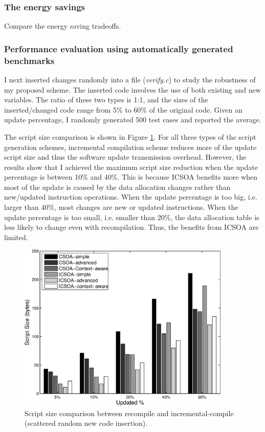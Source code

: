\subsubsection{The energy savings}
Compare the energy saving tradeoffs.

\subsubsection{Performance evaluation using automatically generated benchmarks}
I next inserted changes randomly into a file ({\em verify.c}) to study the robustness of my proposed scheme. The inserted code involves the use of both existing and new variables. The ratio of these two types is 1:1, and the sizes of the inserted/changed code range from 5\% to 60\% of the original code. Given an update percentage, I randomly generated 500 test cases and reported the average.

The script size comparison is shown in Figure \ref{upd_rand_bar}. For all three types of the script generation schemes, incremental compilation scheme reduces more of the
update script size and thus the software update transmission overhead. However, the results show that I achieved the maximum script size reduction when the update percentage is between 10\% and 40\%. This is because ICSOA benefits more when most of the update is caused by the data allocation changes rather than new/updated instruction operations. When the update percentage is too big, i.e. larger than 40\%, most changes are new or updated instructions. When the update percentage is too small, i.e. smaller than 20\%, the data allocation table is less likely to change even with recompilation. Thus, the benefits from ICSOA are limited.


\begin{figure}[htbp]
\begin{center}
\includegraphics[width=4in]{./figures/upd_rand_bar.eps}
\caption{Script size comparison between recompile and incremental-compile (scattered random new code insertion).}
\label{upd_rand_bar}
\end{center}
\vspace{-0.2in}
\end{figure}

